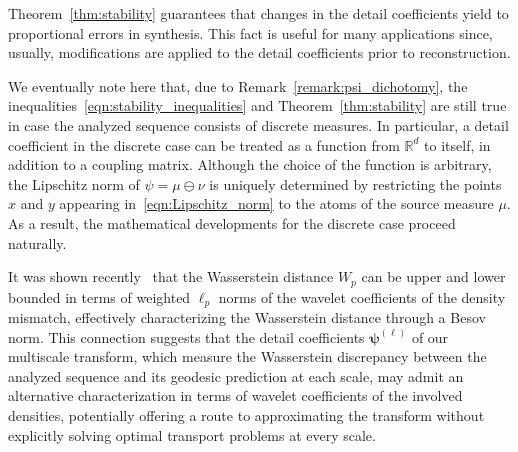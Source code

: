 \documentclass[12pt]{amsart}
\newtheorem{remark}{Remark}[section]
\begin{document}
Theorem~\ref{thm:stability} guarantees that changes in the detail coefficients yield to proportional errors in synthesis. This fact is useful for many applications since, usually, modifications are applied to the detail coefficients prior to reconstruction.

We eventually note here that, due to Remark~\ref{remark:psi_dichotomy}, the inequalities~\eqref{eqn:stability_inequalities} and Theorem~\ref{thm:stability} are still true in case the analyzed sequence consists of discrete measures. In particular, a detail coefficient in the discrete case can be treated as a function from $\mathbb{R}^d$ to itself, in addition to a coupling matrix. Although the choice of the function is arbitrary, the Lipschitz norm of $\psi=\mu\ominus\nu$ is uniquely determined by restricting the points $x$ and $y$ appearing in~\eqref{eqn:Lipschitz_norm} to the atoms of the source measure $\mu$. As a result, the mathematical developments for the discrete case proceed naturally.

It was shown recently~\cite{nilesweed2022minimax} that the Wasserstein distance $W_p$ can be upper and lower bounded in terms of weighted $\ell_p$ norms of the wavelet coefficients of the density mismatch, effectively characterizing the Wasserstein distance through a Besov norm. This connection suggests that the detail coefficients $\boldsymbol{\psi}^{(\ell)}$ of our multiscale transform, which measure the Wasserstein discrepancy between the analyzed sequence and its geodesic prediction at each scale, may admit an alternative characterization in terms of wavelet coefficients of the involved densities, potentially offering a route to approximating the transform without explicitly solving optimal transport problems at every scale.

\end{document}
